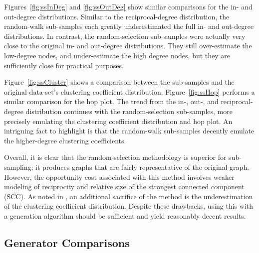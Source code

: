 \documentclass[pdftex,11pt,a4paper,twocolumn]{scrartcl}
\begin{document}
Figures~\ref{fig:ssInDeg} and \ref{fig:ssOutDeg} show similar comparisons for the in- and out-degree distributions. Similar to the reciprocal-degree distribution, the random-walk sub-samples each greatly underestimated the full in- and out-degree distributions. In contrast, the random-selection sub-samples were actually very close to the original in- and out-degree distributions. They still over-estimate the low-degree nodes, and under-estimate the high degree nodes, but they are sufficiently close for practical purposes. 

Figure~\ref{fig:ssCluster} shows a comparison between the sub-samples and the original data-set's clustering coefficient distribution. Figure~\ref{fig:ssHop} performs a similar comparison for the hop plot. The trend from the in-, out-, and reciprocal-degree distribution continues with the random-selection sub-samples, more precisely emulating the clustering coefficient distribution and hop plot. An intriguing fact to highlight is that the random-walk sub-samples decently emulate the higher-degree clustering coefficients. 

Overall, it is clear that the random-selection methodology is superior for sub-sampling; it produces graphs that are fairly representative of the original graph. However, the opportunity cost associated with this method involves weaker modeling of reciprocity and relative size of the strongest connected component (SCC). As noted in \cite{sampling}, an additional sacrifice of the method is the underestimation of the clustering coefficient distribution. Despite these drawbacks, using this with a generation algorithm should be sufficient and yield reasonably decent results. 


\subsection{Generator Comparisons}
\label{sec:genComp}
\end{document}
